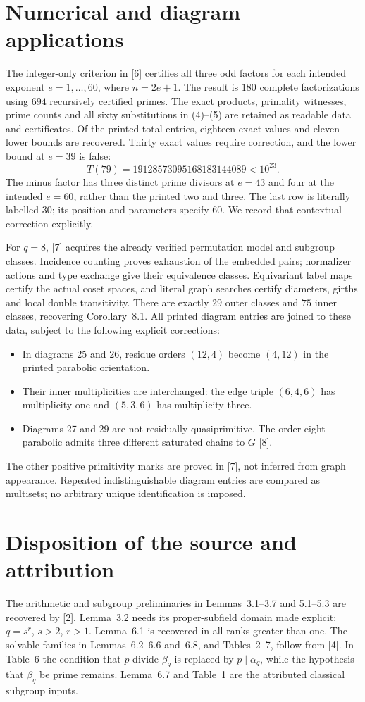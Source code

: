\documentclass[11pt]{article}
\begin{document}
\section{Numerical and diagram applications}
The integer-only criterion in [6] certifies all three odd factors for
each intended exponent $e=1,\ldots,60$, where $n=2e+1$. The result is
$180$ complete factorizations using $694$ recursively certified primes.
The exact products, primality witnesses, prime counts and all sixty
substitutions in (4)--(5) are retained as readable data and certificates.
Of the printed total entries, eighteen exact values and eleven lower
bounds are recovered. Thirty exact values require correction, and the
lower bound at $e=39$ is false:
\[
 T(79)=19128573095168183144089<10^{23}.
\]
The minus factor has three distinct prime divisors at $e=43$ and four
at the intended $e=60$, rather than the printed two and three.
The last row is literally labelled $30$; its position and parameters
specify $60$. We record that contextual correction explicitly.

For $q=8$, [7] acquires the already verified permutation model and
subgroup classes. Incidence counting proves exhaustion of the embedded
pairs; normalizer actions and type exchange give their equivalence
classes. Equivariant label maps certify the actual coset spaces, and
literal graph searches certify diameters, girths and local double
transitivity. There are exactly $29$ outer classes and $75$ inner
classes, recovering Corollary~8.1. All printed diagram entries are joined
to these data, subject to the following explicit corrections:
\begin{itemize}
\item In diagrams 25 and 26, residue orders $(12,4)$ become $(4,12)$
 in the printed parabolic orientation.
\item Their inner multiplicities are interchanged: the edge triple
 $(6,4,6)$ has multiplicity one and $(5,3,6)$ has multiplicity three.
\item Diagrams 27 and 29 are not residually quasiprimitive. The order-eight
 parabolic admits three different saturated chains to $G$ [8].
\end{itemize}
The other positive primitivity marks are proved in [7], not inferred
from graph appearance. Repeated indistinguishable diagram entries are
compared as multisets; no arbitrary unique identification is imposed.

\section{Disposition of the source and attribution}
The arithmetic and subgroup preliminaries in Lemmas~3.1--3.7 and
5.1--5.3 are recovered by [2]. Lemma~3.2 needs its proper-subfield domain
made explicit: $q=s^r$, $s>2$, $r>1$. Lemma~6.1 is recovered in all ranks greater than one.
The solvable families in Lemmas~6.2--6.6 and~6.8, and Tables~2--7, follow
from [4]. In Table~6 the condition that $p$ divide $\beta_q$ is replaced
by $p\mid\alpha_q$, while the hypothesis that $\beta_q$ be prime remains.
Lemma~6.7 and Table~1 are the attributed classical subgroup inputs.
\end{document}
